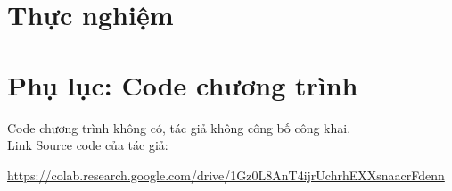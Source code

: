 \documentclass[12pt,a4paper,oneside]{extarticle}
\begin{document}
\renewcommand{\contentsname}{MỤC LỤC}
\tableofcontents
\newpage


\setcounter{page}{1}


\newpage



 
\newpage
 






\section{Thực nghiệm}









\newpage

\appendix

\section{Phụ lục: Code chương trình}

Code chương trình không có, tác giả không công bố công khai.\\
Link Source code của tác giả: 

\url{https://colab.research.google.com/drive/1Gz0L8AnT4ijrUchrhEXXsnaacrFdenn}
\end{document}
